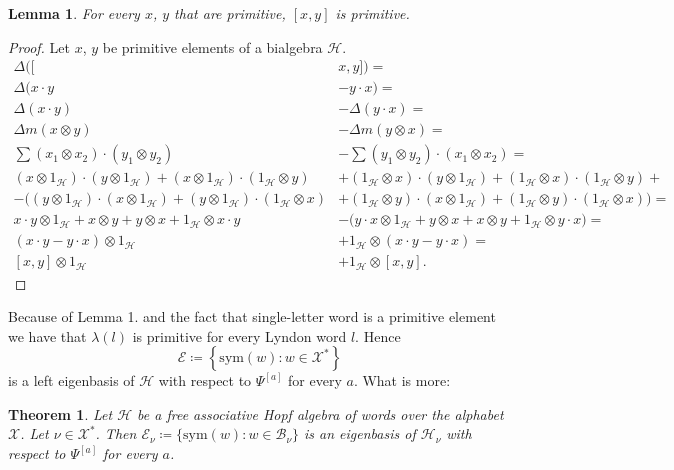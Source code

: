 \documentclass[a4paper, 12pt]{report}
\newtheorem{theorem}{Theorem}
\newtheorem{lemma}{Lemma}
\begin{document}
\begin{lemma}
For every $x$, $y$ that are primitive, $[x, y]$ is primitive.
\end{lemma}

\begin{proof}
Let $x$, $y$ be primitive elements of a bialgebra $\mathcal{H}$.
\begin{align*}
\Delta([&x, y]) = \\ \Delta(x\cdot y &- y\cdot x) =\\ \Delta (x\cdot y) &- \Delta(y\cdot x) =\\
\Delta m(x \otimes y) &- \Delta m(y \otimes x) =\\
\sum (x_1 \otimes x_2) \cdot (y_1 \otimes y_2) &- \sum (y_1 \otimes y_2) \cdot (x_1 \otimes x_2) = \\
(x \otimes 1_\mathcal{H}) \cdot (y \otimes 1_\mathcal{H}) + (x \otimes 1_\mathcal{H}) \cdot (1_\mathcal{H}
\otimes y)
&+ (1_\mathcal{H} \otimes x) \cdot (y \otimes 1_\mathcal{H}) + (1_\mathcal{H} \otimes x) \cdot
(1_\mathcal{H} \otimes y) + \\
- \Big((y \otimes 1_\mathcal{H}) \cdot (x \otimes 1_\mathcal{H}) + (y \otimes 1_\mathcal{H}) \cdot
(1_\mathcal{H} \otimes x)
&+ (1_\mathcal{H} \otimes y) \cdot (x \otimes 1_\mathcal{H}) + (1_\mathcal{H} \otimes y) \cdot
(1_\mathcal{H} \otimes x) \Big) = \\
x \cdot y \otimes 1_\mathcal{H} + x \otimes y + y \otimes x + 1_\mathcal{H} \otimes x \cdot y
&- \Big( y \cdot x \otimes 1_\mathcal{H} + y \otimes x + x \otimes y + 1_\mathcal{H} \otimes y \cdot x
\Big) = \\
(x \cdot y - y \cdot x) \otimes 1_\mathcal{H} &+ 1_\mathcal{H} \otimes (x \cdot y - y \cdot x) = \\
[x, y] \otimes 1_\mathcal{H} &+ 1_\mathcal{H} \otimes [x, y].
\end{align*}

\end{proof}

Because of Lemma 1. and the fact that single-letter word is a primitive element we have that $\lambda(l)$ is
primitive
for every Lyndon word $l$. Hence
\begin{equation*}
\mathcal{E} \coloneqq\left\{\mathrm{sym}(w) : w \in \mathcal{X}^*\right\}
\end{equation*}
is a left eigenbasis of $\mathcal{H}$ with respect to $\Psi^{[a]}$ for every $a$. What is more:

\begin{theorem}
Let $\mathcal{H}$ be a free associative Hopf algebra of words over the alphabet $\mathcal{X}$.
Let $\nu \in \mathcal{X}^*$. Then $\mathcal{E}_\nu \coloneqq \{\mathrm{sym}(w) : w \in \mathcal{B}_\nu\}$ is
an eigenbasis of
$\mathcal{H}_\nu$ with respect to $\Psi^{[a]}$ for every $a$.
\end{theorem}
\end{document}
